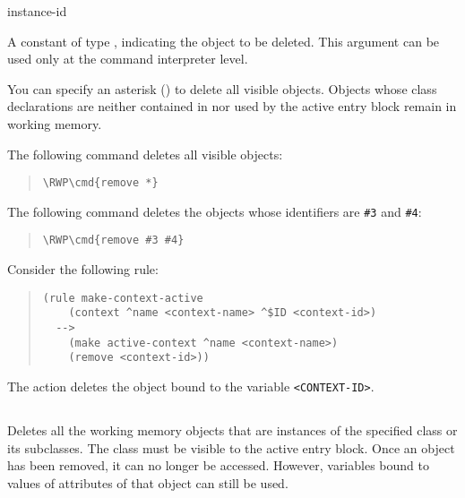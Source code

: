 {{\begin{arguments}
\item[instance-id]

  A constant of type , indicating the object to be
  deleted. This argument can be used only at the command interpreter
  level.

\item[\normalfont\co{*}]

  You can specify an asterisk (\co*) to delete all visible
  objects. Objects whose class declarations are neither contained in
  nor used by the active entry block remain in working memory.
\end{arguments}

\Example

The following command deletes all visible objects:

\begin{quote}
\begin{Verbatim}[commandchars=\\\{\}]
\RWP\cmd{remove *}
\end{Verbatim}
\end{quote}

The following command deletes the objects whose identifiers
are \verb|#3| and \verb|#4|:

\begin{quote}
\begin{Verbatim}[commandchars=\\\{\}]
\RWP\cmd{remove #3 #4}
\end{Verbatim}
\end{quote}

Consider the following rule:

\begin{quote}
\begin{verbatim}
(rule make-context-active
    (context ^name <context-name> ^$ID <context-id>)
  -->
    (make active-context ^name <context-name>)
    (remove <context-id>))
\end{verbatim}
\end{quote}

The  action deletes the object bound to the variable
\verb|<CONTEXT-ID>|.

\subsection{}

Deletes all the working memory objects that are instances of the
specified class or its subclasses. The class must be visible to the
active entry block. Once an object has been removed, it can no longer
be accessed. However, variables bound to values of attributes of that
object can still be used.

}}
